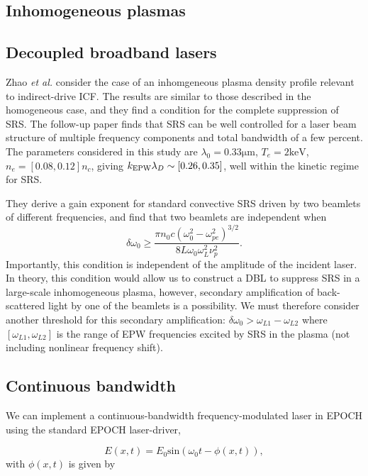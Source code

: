 \subsection{Inhomogeneous plasmas}


\subsection{Decoupled broadband lasers}
Zhao \textit{et al.} \cite{zhao_effective_2017} consider the case of an
inhomgeneous plasma density profile relevant to indirect-drive ICF. The results
are similar to those described in the homogeneous case, and they find a
condition for the complete suppression of SRS. The follow-up paper
\cite{zhao_suppression_2019} finds that SRS can be well controlled for a laser
beam structure of multiple frequency components and total bandwidth of a few
percent. The parameters considered in this study are
$\lambda_0=0.33\si{\micro\metre}$,
$T_e=2\si{\kilo\electronvolt}$, $n_e = [0.08,0.12]n_c$, giving $k_\mathrm{EPW}\lambda_D \sim
[0.26,0.35]$, well within the kinetic regime for SRS.

They derive a gain exponent for standard convective SRS driven by two
beamlets of different frequencies, and find that two beamlets are independent
when
\begin{equation}\label{DLB_threshold_inhomo}
\delta \omega_{0} \geq \frac{\pi n_{0} c\left(\omega_{0}^{2}-\omega_{p
e}^{2}\right)^{3 / 2}}{8 L \omega_{0} \omega_{L}^{2} \nu_{p}^{2}}.
\end{equation}
Importantly, this condition is independent of the amplitude of the incident
laser. In theory, this condition would allow us to construct a DBL to suppress
SRS in a large-scale inhomogeneous plasma, however, secondary amplification of
back-scattered light by one of the beamlets is a possibility. We must therefore
consider another threshold for this secondary amplification: $\delta\omega_0 >
\omega_{L1}-\omega_{L2}$ where $[\omega_{L1},\omega_{L2}]$ is the range of EPW
frequencies excited by SRS in the plasma (not including nonlinear frequency
shift).



\subsection{Continuous bandwidth}
We can implement a continuous-bandwidth frequency-modulated laser in EPOCH using the standard EPOCH laser-driver,

\begin{equation}
 	 E(x,t) = E_0\text{sin}\left(\omega_0 t - \phi(x,t)\right),
\end{equation} with $\phi(x,t)$ is given by

